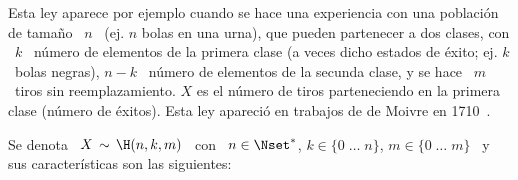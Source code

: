 \label{Sssec:MP:Hipergeometrica}

Esta ley aparece por ejemplo cuando  se hace una experiencia con una poblaci\'on
de tama\~no \  $n$ \ (ej.  $n$ bolas  en una urna), que pueden  partenecer a dos
clases, con  \ $k$ \ n\'umero  de elementos de  la primera clase (a  veces dicho
estados de \'exito; ej. $k$ \ bolas  negras), $n-k$ \ n\'umero de elementos de la
secunda clase, y se  hace \ $m$ \ tiros sin reemplazamiento.   $X$ es el n\'umero
de  tiros parteneciendo  en la  primera clase  (n\'umero de  \'exitos).  Esta ley
apareci\'o en trabajos de de Moivre en 1710~\cite{Moi10, Hal90, DavEdw01}.

Se denota \ $X \, \sim \, \H(n,k,m)$ \  con \ $n \in \Nset^*$, \quad $k \in \{ 0
\;  \ldots  \;  n  \}$,  \quad  $m  \in  \{  0 \;  \ldots  \;  m  \}$  \  y  sus
caracter\'isticas son las siguientes:

